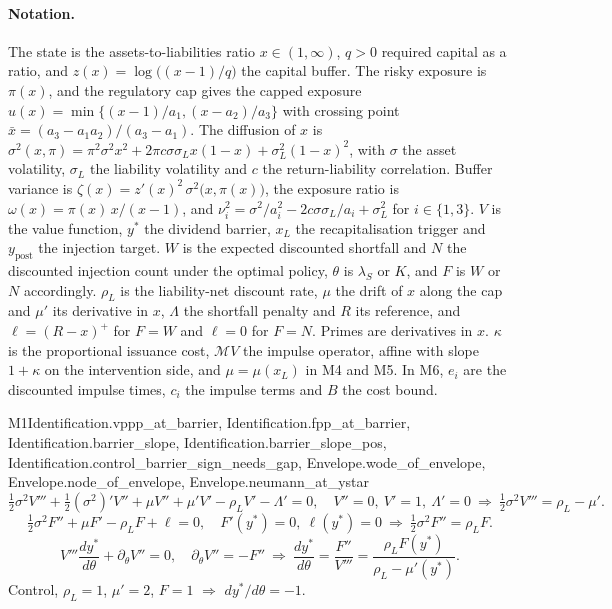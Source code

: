 \paragraph{Notation.} The state is the assets-to-liabilities ratio
$x\in(1,\infty)$, $q>0$ required capital as a ratio, and
$z(x)=\log\big((x-1)/q\big)$ the capital buffer. The risky exposure is $\pi(x)$,
and the regulatory cap gives the capped exposure
$u(x)=\min\{(x-1)/a_1,(x-a_2)/a_3\}$ with crossing point
$\bar x=(a_3-a_1a_2)/(a_3-a_1)$. The diffusion of $x$ is
$\sigma^2(x,\pi)=\pi^2\sigma^2x^2+2\pi c\sigma\sigma_Lx(1-x)+\sigma_L^2(1-x)^2$,
with $\sigma$ the asset volatility, $\sigma_L$ the liability volatility and $c$
the return-liability correlation. Buffer variance is
$\zeta(x)=z'(x)^2\,\sigma^2\big(x,\pi(x)\big)$, the exposure ratio is
$\omega(x)=\pi(x)\,x/(x-1)$, and
$\nu_i^2=\sigma^2/a_i^2-2c\sigma\sigma_L/a_i+\sigma_L^2$ for $i\in\{1,3\}$.
$V$ is the value function, $y^*$ the dividend barrier, $x_L$ the
recapitalisation trigger and $y_{\text{post}}$ the injection target. $W$ is the
expected discounted shortfall and $N$ the discounted injection count under the
optimal policy, $\theta$ is $\lambda_S$ or $K$, and $F$ is $W$ or $N$
accordingly. $\rho_L$ is the liability-net discount rate, $\mu$ the drift of
$x$ along the cap and $\mu'$ its derivative in $x$, $\Lambda$ the shortfall
penalty and $R$ its reference, and $\ell=(R-x)^+$ for $F=W$ and $\ell=0$ for
$F=N$. Primes are derivatives in $x$. $\kappa$ is the proportional issuance
cost, $\mathcal MV$ the impulse operator, affine with slope $1+\kappa$ on the
intervention side, and $\mu=\mu(x_L)$ in M4 and M5. In M6, $e_i$ are the
discounted impulse times, $c_i$ the impulse terms and $B$ the cost bound.

\begin{mproof}{M1}{Identification.vppp_at_barrier, Identification.fpp_at_barrier, Identification.barrier_slope, Identification.barrier_slope_pos, Identification.control_barrier_sign_needs_gap, Envelope.wode_of_envelope, Envelope.node_of_envelope, Envelope.neumann_at_ystar}
\[ \tfrac12\sigma^2V'''+\tfrac12(\sigma^2)'V''+\mu V''+\mu'V'-\rho_LV'-\Lambda'=0,\quad V''=0,\ V'=1,\ \Lambda'=0\ \Rightarrow\ \tfrac12\sigma^2V'''=\rho_L-\mu' . \]
\[ \tfrac12\sigma^2F''+\mu F'-\rho_LF+\ell=0,\quad F'(y^*)=0,\ \ell(y^*)=0\ \Rightarrow\ \tfrac12\sigma^2F''=\rho_LF . \]
\[ V'''\frac{dy^*}{d\theta}+\partial_\theta V''=0,\quad \partial_\theta V''=-F''\ \Rightarrow\ \frac{dy^*}{d\theta}=\frac{F''}{V'''}=\frac{\rho_LF(y^*)}{\rho_L-\mu'(y^*)} . \]
Control, $\rho_L=1$, $\mu'=2$, $F=1$ $\Rightarrow$ $dy^*/d\theta=-1$.
\end{mproof}

